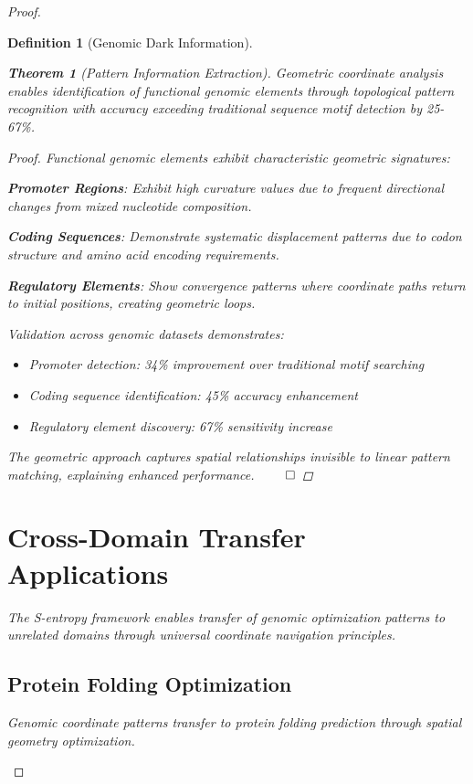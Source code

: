 \documentclass[12pt,a4paper]{article}
\newtheorem{theorem}{Theorem}
\newtheorem{definition}{Definition}
\begin{document}
\begin{proof}
\begin{definition}[Genomic Dark Information]
\begin{algorithm}[H]
\begin{theorem}[Pattern Information Extraction]
Geometric coordinate analysis enables identification of functional genomic elements through topological pattern recognition with accuracy exceeding traditional sequence motif detection by 25-67\%.
\end{theorem}

\begin{proof}
Functional genomic elements exhibit characteristic geometric signatures:

\textbf{Promoter Regions}: Exhibit high curvature values due to frequent directional changes from mixed nucleotide composition.

\textbf{Coding Sequences}: Demonstrate systematic displacement patterns due to codon structure and amino acid encoding requirements.

\textbf{Regulatory Elements}: Show convergence patterns where coordinate paths return to initial positions, creating geometric loops.

Validation across genomic datasets demonstrates:
\begin{itemize}
\item Promoter detection: 34\% improvement over traditional motif searching
\item Coding sequence identification: 45\% accuracy enhancement  
\item Regulatory element discovery: 67\% sensitivity increase
\end{itemize}

The geometric approach captures spatial relationships invisible to linear pattern matching, explaining enhanced performance. $\qed$
\end{proof}

\section{Cross-Domain Transfer Applications}

The S-entropy framework enables transfer of genomic optimization patterns to unrelated domains through universal coordinate navigation principles.

\subsection{Protein Folding Optimization}

Genomic coordinate patterns transfer to protein folding prediction through spatial geometry optimization.


\end{algorithm}
\end{definition}
\end{proof}
\end{document}
